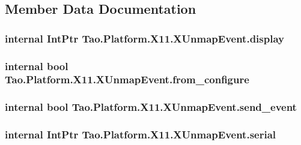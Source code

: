 \subsection{Member Data Documentation}
\hypertarget{struct_tao_1_1_platform_1_1_x11_1_1_x_unmap_event_a3c76c1f872593af19bd5b6b84fcbf2b1}{
\subsubsection[{display}]{\setlength{\rightskip}{0pt plus 5cm}internal IntPtr {\bf Tao.Platform.X11.XUnmapEvent.display}}}
\label{struct_tao_1_1_platform_1_1_x11_1_1_x_unmap_event_a3c76c1f872593af19bd5b6b84fcbf2b1}
\hypertarget{struct_tao_1_1_platform_1_1_x11_1_1_x_unmap_event_aa71cc41e30b73a14a708bc6cb12ed696}{
\subsubsection[{from\_\-configure}]{\setlength{\rightskip}{0pt plus 5cm}internal bool {\bf Tao.Platform.X11.XUnmapEvent.from\_\-configure}}}
\label{struct_tao_1_1_platform_1_1_x11_1_1_x_unmap_event_aa71cc41e30b73a14a708bc6cb12ed696}
\hypertarget{struct_tao_1_1_platform_1_1_x11_1_1_x_unmap_event_a06be146eace6aa960e5e9f4b026a724e}{
\subsubsection[{send\_\-event}]{\setlength{\rightskip}{0pt plus 5cm}internal bool {\bf Tao.Platform.X11.XUnmapEvent.send\_\-event}}}
\label{struct_tao_1_1_platform_1_1_x11_1_1_x_unmap_event_a06be146eace6aa960e5e9f4b026a724e}
\hypertarget{struct_tao_1_1_platform_1_1_x11_1_1_x_unmap_event_a2ae81f49e4a294e84b498536555f9113}{
\subsubsection[{serial}]{\setlength{\rightskip}{0pt plus 5cm}internal IntPtr {\bf Tao.Platform.X11.XUnmapEvent.serial}}}
